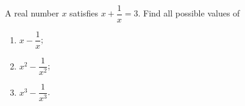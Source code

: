 A real number $x$ satisfies $x+\dfrac{1}{x}=3$. Find all possible values of
\begin{enumerate}
\item[(a)] $x-\dfrac{1}{x}$;
\item[(b)] $x^2-\dfrac{1}{x^2}$;
\item[(c)] $x^3-\dfrac{1}{x^3}$.
\end{enumerate}
